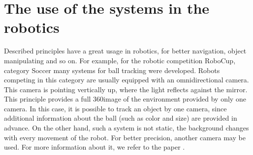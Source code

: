 \section{The use of the systems in the robotics}

Described principles have a great usage in robotics, for better navigation,
object manipulating and so on. For example, for the robotic competition
RoboCup, category Soccer many systems for ball tracking were developed. Robots
competing in this category are usually equipped with an omnidirectional camera.
This camera is pointing vertically up, where the light reflects against the
mirror. This principle provides a full 360\degree image of the environment
provided by only one camera. In this case, it is possible to track an object by
one camera, since additional information about the ball (such as color and
size) are provided in advance. On the other hand, such a system is not static,
the background changes with every movement of the robot. For better precision,
another camera may be used. For more information about it, we refer to the
paper \citet*{kappeler20103d}. 
